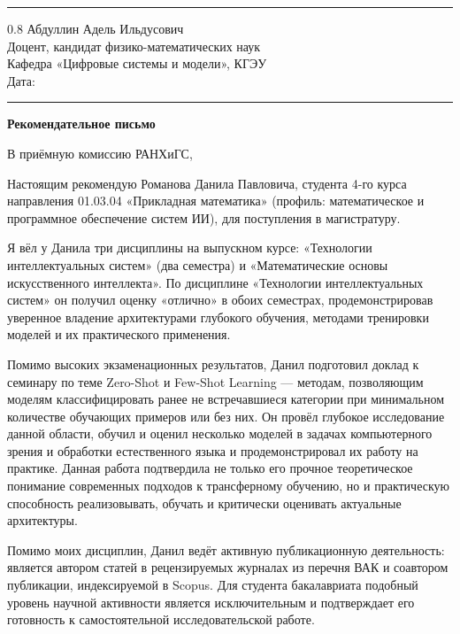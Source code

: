 \documentclass[a4paper,12pt]{article}
\begin{document}
\vspace{4pt}
\noindent\rule{\textwidth}{0.8pt}

\begin{flushright}
  \begin{spacing}{0.8}
    Абдуллин Адель Ильдусович\\
    Доцент, кандидат физико-математических наук\\
    Кафедра «Цифровые системы и модели», КГЭУ\\[6pt]
    Дата: \rule{4cm}{0.4pt}
  \end{spacing}
\end{flushright}

\begin{center}
  {\Large\bfseries Рекомендательное письмо}
\end{center}

В приёмную комиссию РАНХиГС,

Настоящим рекомендую Романова Данила Павловича, студента 4-го курса направления 01.03.04 «Прикладная математика» (профиль: ма\-те\-ма\-ти\-че\-ское и про\-грамм\-ное обес\-пе\-че\-ние систем ИИ), для по\-сту\-пле\-ния в ма\-ги\-стра\-ту\-ру.

Я вёл у Данила три дисциплины на выпускном курсе: «Технологии интеллектуальных систем» (два семестра) и «Математические основы искусственного интеллекта». По дисциплине «Технологии интеллектуальных систем» он получил оценку «отлично» в обоих семестрах, продемонстрировав уверенное владение архитектурами глубокого обучения, методами тренировки моделей и их практического применения.

Помимо высоких экзаменационных результатов, Данил подготовил доклад к семинару по теме Zero-Shot и Few-Shot Learning --- методам, позволяющим моделям классифицировать ранее не встречавшиеся категории при минимальном количестве обучающих примеров или без них. Он провёл глубокое исследование данной области, обучил и оценил несколько моделей в задачах компьютерного зрения и обработки естественного языка и продемонстрировал их работу на практике. Данная работа подтвердила не только его прочное теоретическое понимание современных подходов к трансферному обучению, но и практическую способность реализовывать, обучать и критически оценивать актуальные архитектуры.

Помимо моих дисциплин, Данил ведёт активную публикационную деятельность: является автором статей в рецензируемых журналах из перечня ВАК и соавтором публикации, индексируемой в Scopus. Для студента бакалавриата подобный уровень научной активности является исключительным и подтверждает его готовность к самостоятельной исследовательской работе.
\end{document}
